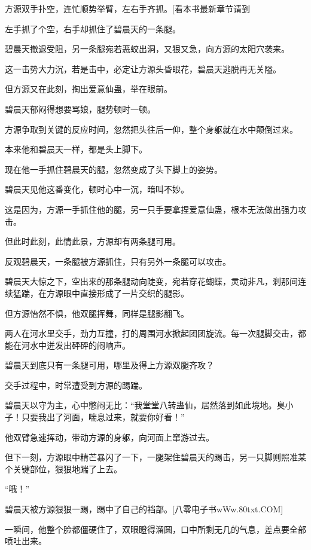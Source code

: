 
\begin{this_body}

方源双手扑空，连忙顺势举臂，左右手齐抓。[看本书最新章节请到

左手抓了个空，右手却抓住了碧晨天的一条腿。

碧晨天撤退受阻，另一条腿宛若恶蛟出洞，又狠又急，向方源的太阳穴袭来。

这一击势大力沉，若是击中，必定让方源头昏眼花，碧晨天逃脱再无关隘。

但方源又在此刻，掏出爱意仙蛊，举在眼前。

碧晨天郁闷得想要骂娘，腿势顿时一顿。

方源争取到关键的反应时间，忽然把头往后一仰，整个身躯就在水中颠倒过来。

本来他和碧晨天一样，都是头上脚下。

现在他一手抓住碧晨天的腿，忽然变成了头下脚上的姿势。

碧晨天见他这番变化，顿时心中一沉，暗叫不妙。

这是因为，方源一手抓住他的腿，另一只手要拿捏爱意仙蛊，根本无法做出强力攻击。

但此时此刻，此情此景，方源却有两条腿可用。

反观碧晨天，一条腿被方源抓住，只有另外一条腿可以攻击。

碧晨天大惊之下，空出来的那条腿动向陡变，宛若穿花蝴蝶，灵动非凡，刹那间连续猛踹，在方源眼中直接形成了一片交织的腿影。

但方源怡然不惧，他双腿挥舞，同样是腿影翻飞。

两人在河水里交手，劲力互撞，打的周围河水掀起团团旋流。每一次腿脚交击，都能在河水中迸发出砰砰的闷响声。

碧晨天到底只有一条腿可用，哪里及得上方源双腿齐攻？

交手过程中，时常遭受到方源的踢踹。

碧晨天以守为主，心中憋闷无比：“我堂堂八转蛊仙，居然落到如此境地。臭小子！只要我出了河面，喘息过来，就要你好看！”

他双臂急速挥动，带动方源的身躯，向河面上窜游过去。

但下一刻，方源眼中精芒暴闪了一下，一腿架住碧晨天的踢击，另一只脚则照准某个关键部位，狠狠地踹了上去。

“哦！”

碧晨天被方源狠狠一踢，踢中了自己的裆部。[八零电子书wWw.80txt.COM]

一瞬间，他整个脸都僵硬住了，双眼瞪得溜圆，口中所剩无几的气息，差点要全部喷吐出来。


\end{this_body}
